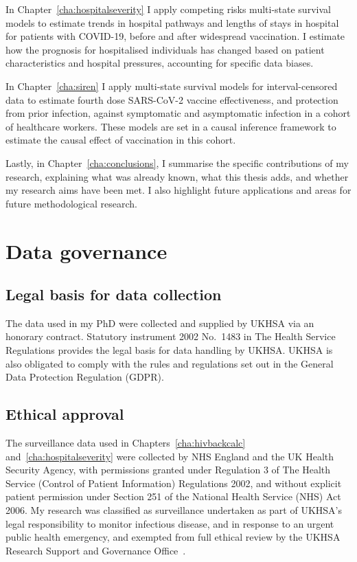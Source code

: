 In Chapter~\ref{cha:hospitalseverity} I apply competing risks multi-state survival models to estimate trends in hospital pathways and lengths of stays in hospital for patients with COVID-19, before and after widespread vaccination. I estimate how the prognosis for hospitalised individuals has changed based on patient characteristics and hospital pressures, accounting for specific data biases.

In Chapter~\ref{cha:siren} I apply multi-state survival models for interval-censored data to estimate fourth dose SARS-CoV-2 vaccine effectiveness, and protection from prior infection, against symptomatic and asymptomatic infection in a cohort of healthcare workers. These models are set in a causal inference framework to estimate the causal effect of vaccination in this cohort.

Lastly, in Chapter~\ref{cha:conclusions}, I summarise the specific contributions of my research, explaining what was already known, what this thesis adds, and whether my research aims have been met. I also highlight future applications and areas for future methodological research.

\section{Data governance}

\subsection{Legal basis for data collection}

The data used in my PhD were collected and supplied by UKHSA via an honorary contract. Statutory instrument 2002 No.\ 1483 in The Health Service Regulations provides the legal basis for data handling by UKHSA\@. UKHSA is also obligated to comply with the rules and regulations set out in the General Data Protection Regulation (GDPR).

\subsection{Ethical approval}

The surveillance data used in Chapters~\ref{cha:hivbackcalc} and~\ref{cha:hospitalseverity} were collected by NHS England and the UK Health Security Agency, with permissions granted under Regulation 3 of The Health Service (Control of Patient Information) Regulations 2002, and without explicit patient permission under Section 251 of the National Health Service (NHS) Act 2006. My research was classified as surveillance undertaken as part of UKHSA's legal responsibility to monitor infectious disease, and in response to an urgent public health emergency, and exempted from full ethical review by the UKHSA Research Support and Governance Office~\parencite{Kirwan2022-ka, Kirwan2022-za}.

